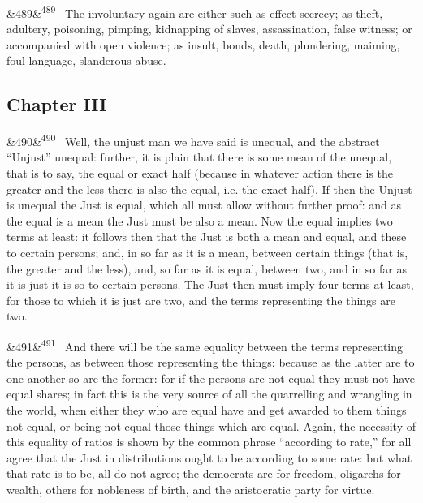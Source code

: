 \documentclass[12pt]{article}
\newcommand{\para}[1][]{\par\noindent\ifx&#1&\else\textsuperscript{\footnotesize #1}~\fi}
\begin{document}
\para[489] The involuntary again are either such as effect secrecy; as theft, adultery, poisoning, pimping, kidnapping of slaves, assassination, false witness; or accompanied with open violence; as insult, bonds, death, plundering, maiming, foul language, slanderous abuse.

\subsection*{Chapter III}

\para[490] Well, the unjust man we have said is unequal, and the abstract “Unjust” unequal: further, it is plain that there is some mean of the unequal, that is to say, the equal or exact half (because in whatever action there is the greater and the less there is also the equal, i.e. the exact half). If then the Unjust is unequal the Just is equal, which all must allow without further proof: and as the equal is a mean the Just must be also a mean. Now the equal implies two terms at least: it follows then that the Just is both a mean and equal, and these to certain persons; and, in so far as it is a mean, between certain things (that is, the greater and the less), and, so far as it is equal, between two, and in so far as it is just it is so to certain persons. The Just then must imply four terms at least, for those to which it is just are two, and the terms representing the things are two.

\para[491] And there will be the same equality between the terms representing the persons, as between those representing the things: because as the latter are to one another so are the former: for if the persons are not equal they must not have equal shares; in fact this is the very source of all the quarrelling and wrangling in the world, when either they who are equal have and get awarded to them things not equal, or being not equal those things which are equal. Again, the necessity of this equality of ratios is shown by the common phrase “according to rate,” for all agree that the Just in distributions ought to be according to some rate: but what that rate is to be, all do not agree; the democrats are for freedom, oligarchs for wealth, others for nobleness of birth, and the aristocratic party for virtue.
\end{document}
